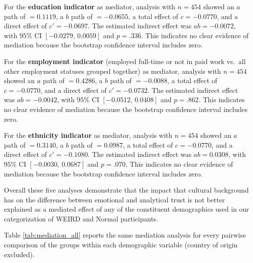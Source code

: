 For the \textbf{education indicator} as mediator, analysis with $n=454$ showed an $a$ path of $=0.1119$, a $b$ path of $=-0.0655$, a total effect of $c=-0.0770$, and a direct effect of $c'=-0.0697$. The estimated indirect effect was $ab=-0.0072$, with $95\%$ CI $[-0.0279,\,0.0059]$ and $p=.336$. This indicates no clear evidence of mediation because the bootstrap confidence interval includes zero.

For the \textbf{employment indicator} (employed full-time or not in paid work vs.\ all other employment statuses grouped together) as mediator, analysis with $n=454$ showed an $a$ path of $=0.4286$, a $b$ path of $=-0.0088$, a total effect of $c=-0.0770$, and a direct effect of $c'=-0.0732$. The estimated indirect effect was $ab=-0.0042$, with $95\%$ CI $[-0.0512,\,0.0408]$ and $p=.862$. This indicates no clear evidence of mediation because the bootstrap confidence interval includes zero. 

For the \textbf{ethnicity indicator} as mediator, analysis with $n=454$ showed an $a$ path of $=0.3140$, a $b$ path of $=0.0987$, a total effect of $c=-0.0770$, and a direct effect of $c'=-0.1080$. The estimated indirect effect was $ab=0.0308$, with $95\%$ CI $[-0.0030,\,0.0687]$ and $p=.070$. This indicates no clear evidence of mediation because the bootstrap confidence interval includes zero.

Overall these five analyses demonstrate that the impact that cultural background has on the difference between emotional and analytical trust is not better explained as a mediated effect of any of the constituent demographics used in our categorization of WEIRD and Normal participants.

Table \ref{tab:mediation_all} reports the same mediation analysis for every pairwise comparison of the groups within each demographic variable (country of origin excluded).


